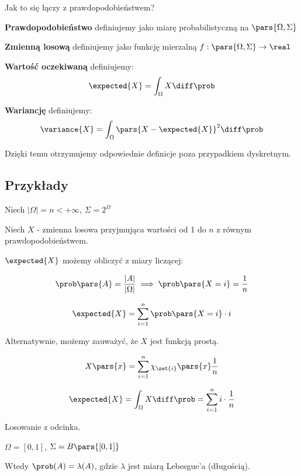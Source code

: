 \begin{corollary}

	Jak to się łączy z prawdopodobieństwem?

	\textbf{Prawdopodobieństwo} definiujemy jako miarę probabilistyczną na \( \pars{ \Omega, \Sigma } \)

	\textbf{Zmienną losową} definiujemy jako funkcję mierzalną \( f: \pars{ \Omega, \Sigma } \to \real \)

	\textbf{Wartość oczekiwaną} definiujemy:
	\[
		\expected{X} = \int_{\Omega} X \diff \prob
	\]

	\textbf{Wariancję} definiujemy:
	\[
		\variance{X} = \int_{\Omega} \pars{ X - \expected{X} }^2 \diff \prob
	\]

	Dzięki temu otrzymujemy odpowiednie definicje poza przypadkiem dyskretnym.
\end{corollary}

\subsection{Przykłady}

\begin{example}

	Niech \( \left| \Omega \right| = n < +\infty \), \( \Sigma = 2^{\Omega} \)

	Niech \( X \) - zmienna losowa przyjmująca wartości od 1 do \( n \) z równym prawdopodobieństwem.

	\( \expected{X} \) możemy obliczyć z miary liczącej:

	\[
		\prob \pars{ A } = \frac{ \left| A \right| }{ \left| \Omega \right| } \implies \prob \pars{ X = i } = \frac{1}{n}
	\]

	\[
		\expected{X} = \sum_{i = 1}^{n} \prob \pars{ X = i } \cdot i
	\]

	Alternatywnie, możemy zauważyć, że \( X \) jest funkcją prostą.

	\[
		X \pars{ x } = \sum_{i = 1}^{n} \chi_{\set{ i }}\pars{ x } \frac{1}{n}
	\]

	\[
		\expected{X} = \int_{\Omega} X \diff \prob = \sum_{i=1}^{n} i \cdot \frac{1}{n}
	\]

\end{example}

\begin{example}
	Losowanie z odcinka.

	\( \Omega = [ 0, 1] \), \( \Sigma = B\pars{[0, 1] } \)

	Wtedy \( \prob(A) = \lambda(A) \), gdzie \( \lambda \) jest miarą Lebesgue'a (długością).

\end{example}

